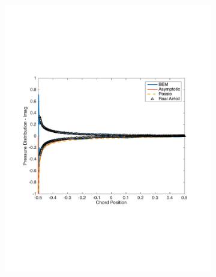 \documentclass{article}
\begin{document}
\begin{figure}[h]
\begin{subfigure}{0.3\textwidth}
	\includegraphics[width = \textwidth, height=0.2\textheight]{pressure_k10imag}
\end{subfigure}%
\begin{subfigure}{0.33\textwidth}
	\centering

\end{subfigure}
\end{figure}
\end{document}
